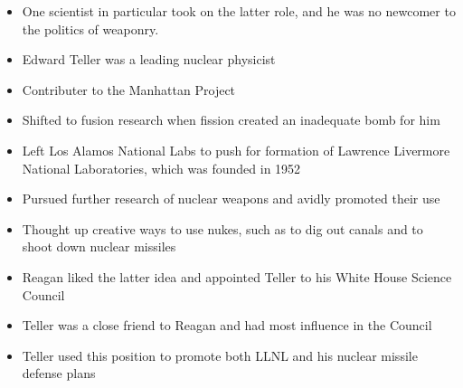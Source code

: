 \documentclass[12pt]{article}
\begin{document}
\begin{description}
\begin{description}
\begin{itemize}
          \item One scientist in particular took on the latter role, and he was
            no newcomer to the politics of weaponry.

          \item Edward Teller was a leading nuclear physicist

          \item Contributer to the Manhattan Project

          \item Shifted to fusion research when fission created an inadequate
            bomb for him

          \item Left Los Alamos National Labs to push for formation of Lawrence
            Livermore National Laboratories, which was founded in 1952

          \item Pursued further research of nuclear weapons and avidly promoted
            their use

          \item Thought up creative ways to use nukes, such as to dig out
            canals and to shoot down nuclear missiles

          \item Reagan liked the latter idea and appointed Teller to his White
            House Science Council

          \item Teller was a close friend to Reagan and had most influence in
            the Council

          \item Teller used this position to promote both LLNL and his nuclear
            missile defense plans

        \end{itemize}
        

\end{description}
\end{description}
\end{document}
